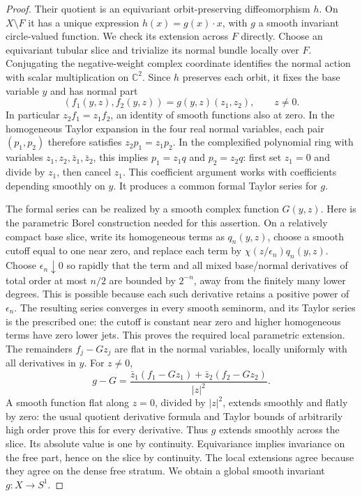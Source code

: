 \begin{proof}
Their quotient is an equivariant orbit-preserving diffeomorphism
\(h\). On \(X\setminus F\) it has a unique expression
\(h(x)=g(x)\cdot x\), with \(g\) a smooth invariant circle-valued
function. We check its extension across \(F\) directly. Choose an
equivariant tubular slice and trivialize its normal bundle locally
over \(F\). Conjugating the negative-weight complex coordinate
identifies the normal action with scalar multiplication on
\(\mathbb C^2\). Since \(h\) preserves each orbit, it fixes the
base variable \(y\) and has normal part
\[
 (f_1(y,z),f_2(y,z))=g(y,z)(z_1,z_2),\qquad z\ne0.
\]
In particular \(z_2f_1=z_1f_2\), an identity of smooth functions
also at zero. In the homogeneous Taylor expansion in the four real
normal variables, each pair \((p_1,p_2)\) therefore satisfies
\(z_2p_1=z_1p_2\). In the complexified polynomial ring with
variables \(z_1,z_2,\bar z_1,\bar z_2\), this implies
\(p_1=z_1q\) and \(p_2=z_2q\): first set \(z_1=0\) and divide
by \(z_1\), then cancel \(z_1\). This coefficient argument works
with coefficients depending smoothly on \(y\). It produces a
common formal Taylor series for \(g\).

The formal series can be realized by a smooth complex function
\(G(y,z)\). Here is the parametric Borel construction needed for
this assertion. On a relatively compact base slice, write its
homogeneous terms as \(q_n(y,z)\), choose a smooth cutoff equal to
one near zero, and replace each term by
\(\chi(z/\epsilon_n)q_n(y,z)\). Choose
\(\epsilon_n\downarrow0\) so rapidly that the term and all
mixed base/normal derivatives of total order at most \(n/2\)
are bounded by \(2^{-n}\), away from the finitely many lower
degrees. This is possible because each such derivative retains a
positive power of \(\epsilon_n\). The resulting series converges
in every smooth seminorm, and its Taylor series is the prescribed
one: the cutoff is constant near zero and higher homogeneous
terms have zero lower jets. This proves the required local
parametric extension. The remainders
\(f_j-Gz_j\) are flat in the normal variables, locally uniformly
with all derivatives in \(y\). For \(z\ne0\),
\[
 g-G=\frac{\bar z_1(f_1-Gz_1)+\bar z_2(f_2-Gz_2)}{|z|^2}.
\]
A smooth function flat along \(z=0\), divided by \(|z|^2\),
extends smoothly and flatly by zero: the usual quotient derivative
formula and Taylor bounds of arbitrarily high order prove this for
every derivative. Thus \(g\) extends smoothly across the slice.
Its absolute value is one by continuity. Equivariance implies
invariance on the free part, hence on the slice by continuity.
The local extensions agree because they agree on the dense free
stratum. We obtain a global smooth invariant \(g:X\to S^1\).


\end{proof}
